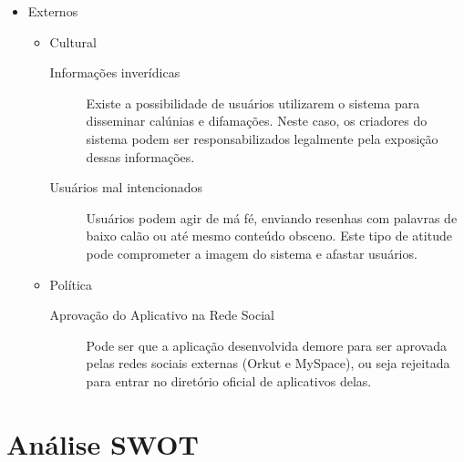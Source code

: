 \documentclass[]{article}
\begin{document}
\begin{itemize}
  \item Externos
  \begin{itemize}
    
    \item Cultural
    \begin{description}
      \item[Informações inverídicas] Existe a possibilidade de usuários utilizarem o sistema para disseminar calúnias e difamações. Neste caso, os criadores do sistema podem ser responsabilizados legalmente pela exposição dessas informações.
      \item[Usuários mal intencionados] Usuários podem agir de má fé, enviando resenhas com palavras de baixo calão ou até mesmo conteúdo obsceno. Este tipo de atitude pode comprometer a imagem do sistema e afastar usuários.
    \end{description}
    
    \item Política
    \begin{description}
      \item[Aprovação do Aplicativo na Rede Social] Pode ser que a aplicação desenvolvida demore para ser aprovada pelas redes sociais externas (Orkut e MySpace), ou seja rejeitada para entrar no diretório oficial de aplicativos delas.
    \end{description}
  \end{itemize}
  
\end{itemize}


\section{Análise SWOT} %
\label{sec:analise_swot}
\end{document}
